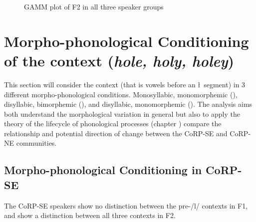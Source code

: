 \documentclass[../../../00.FullDoc/tex/Thesis]{subfiles}
\begin{document}
\begin{landscape}
	\vspace*{\fill}
	\begin{center}
		\begin{figure}[h]
			
			\caption{GAMM plot of F2 in all three speaker groups} \label{fig:GGF2}
		\end{figure}
	\end{center}
	\vspace*{\fill}
\end{landscape}



\section{Morpho-phonological Conditioning of the \goal{} context (\textit{hole, holy, holey})} \label{sec:GOATmorph}
This section will consider the \goal{} context (that is \goat{} vowels before an \l\ segment) in 3 different morpho-phonological conditions. Monosyllabic, monomorphemic (\hole{}), disyllabic, bimorphemic (\holey{}), and disyllabic, monomorphemic (\holy{}). The analysis aims both understand the morphological variation in general but also to apply the theory of the lifecycle of phonological processes (chapter \notinsubfile{\ref{ch:LitReview}}) compare the relationship and potential direction of change between the CoRP-SE and CoRP-NE communities.

\subsection{Morpho-phonological Conditioning in CoRP-SE}
The CoRP-SE speakers show no distinction between the pre-/l/ contexts in F1, and show a distinction between all three contexts in F2.
\end{document}
